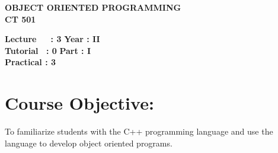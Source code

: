 \begin{center}
    \textbf{\huge{\uppercase{Object Oriented Programming}}}
    \\
    \vspace{.5cm}
    \textbf{\large{CT 501}}
\end{center}

\noindent\textbf{Lecture\ \ \ : 3} \hfill \textbf{Year : II } \\
\textbf{Tutorial \ : 0} \hfill \textbf{Part : I } \\
\textbf{Practical : 3}  \\

\par
\noindent 
\section*{Course Objective:}
To familiarize students with the C++ programming language and use the language to develop object oriented programs.

